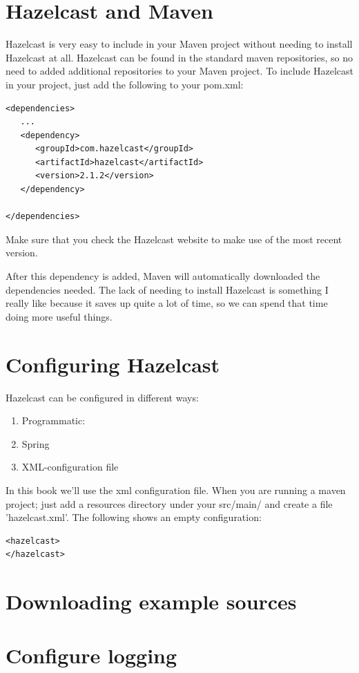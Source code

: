 \section{Hazelcast and Maven}

Hazelcast is very easy to include in your Maven project without needing to install Hazelcast at all.  
Hazelcast can be found in the standard maven repositories, so no need to added additional repositories to 
your Maven project. To include Hazelcast in your project, just add the following to your pom.xml:

\begin{verbatim}
<dependencies>	
   ...
   <dependency>
      <groupId>com.hazelcast</groupId>
      <artifactId>hazelcast</artifactId>
      <version>2.1.2</version>
   </dependency>

</dependencies>
\end{verbatim}	

Make sure that you check the Hazelcast website to make use of the most recent version. 

After this dependency is added, Maven will automatically downloaded the dependencies needed. 
The lack of needing to install Hazelcast is something I really like because it saves up quite a lot of time, 
so we can spend that time doing more useful things.

\section{Configuring Hazelcast}
Hazelcast can be configured in different ways:
\begin{enumerate}
\item Programmatic:
\item Spring
\item XML-configuration file
\end{enumerate}
In this book we'll use the xml configuration file. When you are running a maven project; just add
a resources directory under your src/main/ and create a file 'hazelcast.xml'. The following shows
an empty configuration:
\begin{verbatim}
<hazelcast>
</hazelcast>
\end{verbatim}

\section{Downloading example sources}

\section{Configure logging}


